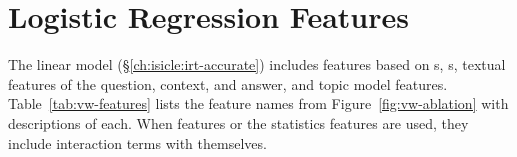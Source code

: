 



\section{Logistic Regression Features}
\label{ch:isicle:apx:features}

The linear model (\S\ref{ch:isicle:irt-accurate}) includes features based on \itm{} s, \subj{} s, textual features of the question, context, and answer, and topic model features.
Table~\ref{tab:vw-features} lists the feature names from Figure~\ref{fig:vw-ablation} with descriptions of each.
When \irt{} features or the statistics features are used, they include interaction terms with themselves.

